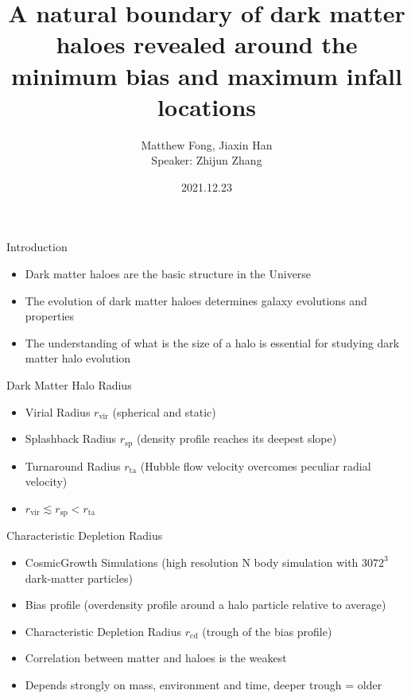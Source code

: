 \documentclass{beamer}
\title{\large A natural boundary of dark matter haloes revealed around the minimum bias and maximum infall locations}
\author{Matthew Fong, Jiaxin Han \texorpdfstring{\\ \vspace{2em}}{} Speaker: Zhijun Zhang}
\date{2021.12.23}
\begin{document}
\begin{frame}[plain]
    \maketitle
\end{frame}

\begin{frame}{Introduction}
    \begin{itemize}
        \item[\bullet] Dark matter haloes are the basic structure in the Universe
        \item[\bullet] The evolution of dark matter haloes determines galaxy evolutions and properties
        \item[\bullet] The understanding of what is the size of a halo is essential for studying dark matter halo evolution
    \end{itemize}
\end{frame}

\begin{frame}{Dark Matter Halo Radius}
    \begin{itemize}
        \item[\bullet] Virial Radius $r_{\mathrm{vir}}$ (spherical and static)
        \item[\bullet] Splashback Radius $r_{\mathrm{sp}}$ (density profile reaches its deepest slope)
        \item[\bullet] Turnaround Radius $r_{\mathrm{ta}}$ (Hubble flow velocity overcomes peculiar radial velocity)
        \item[\bullet] $r_{\mathrm{vir}}\lesssim r_{\mathrm{sp}}<r_{\mathrm{ta}}$
    \end{itemize}
\end{frame}

\begin{frame}{Characteristic Depletion Radius}
    \begin{itemize}
        \item[\bullet] CosmicGrowth Simulations (high resolution N body simulation with $3072^3$ dark-matter particles)
        \item[\bullet] Bias profile (overdensity profile around a halo particle relative to average)
        \item[\bullet] Characteristic Depletion Radius $r_{\mathrm{cd}}$ (trough of the bias profile)
        \item[\bullet] Correlation between matter and haloes is the weakest
        \item[\bullet] Depends strongly on mass, environment and time, deeper trough = older
    \end{itemize}
\end{frame}
\end{document}
